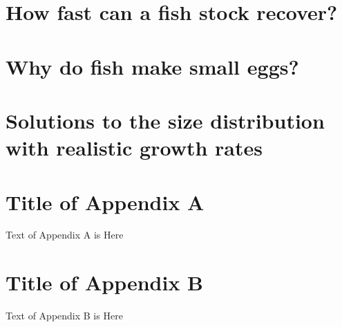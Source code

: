 \documentclass{article}
\begin{document}
\subsection{}\label{sec:Ex3A}

\newpage



\section{How fast can a fish stock recover?}\label{sec:Ex4}
\subsection{}\label{sec:Ex4A}

\newpage



\section{Why do fish make small eggs?}\label{sec:Ex5}
\subsection{}\label{sec:Ex5A}

\newpage



\section{Solutions to the size distribution with realistic growth rates}\label{sec:Ex6}
\subsection{}\label{sec:Ex6A}

\cleardoublepage
\appendix
\section{Title of Appendix A}

Text of Appendix A is Here

\section{Title of Appendix B}

Text of Appendix B is Here
\end{document}
